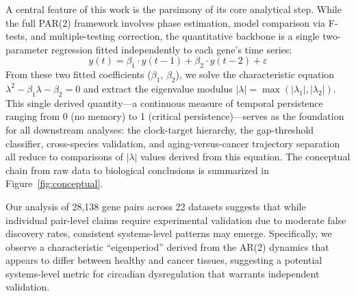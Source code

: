 \documentclass[11pt,a4paper]{article}
\begin{document}
A central feature of this work is the parsimony of its core analytical step. While the full PAR(2) framework involves phase estimation, model comparison via F-tests, and multiple-testing correction, the quantitative backbone is a single two-parameter regression fitted independently to each gene's time series:
\[
y(t) = \beta_1 \cdot y(t{-}1) + \beta_2 \cdot y(t{-}2) + \varepsilon
\]
From these two fitted coefficients ($\beta_1$, $\beta_2$), we solve the characteristic equation $\lambda^2 - \beta_1\lambda - \beta_2 = 0$ and extract the eigenvalue modulus $|\lambda| = \max(|\lambda_1|, |\lambda_2|)$. This single derived quantity---a continuous measure of temporal persistence ranging from 0 (no memory) to 1 (critical persistence)---serves as the foundation for all downstream analyses: the clock-target hierarchy, the gap-threshold classifier, cross-species validation, and aging-versus-cancer trajectory separation all reduce to comparisons of $|\lambda|$ values derived from this equation. The conceptual chain from raw data to biological conclusions is summarized in Figure~\ref{fig:conceptual}.

Our analysis of 28,138 gene pairs across 22 datasets suggests that while individual pair-level claims require experimental validation due to moderate false discovery rates, consistent systems-level patterns may emerge. Specifically, we observe a characteristic ``eigenperiod'' derived from the AR(2) dynamics that appears to differ between healthy and cancer tissues, suggesting a potential systems-level metric for circadian dysregulation that warrants independent validation.
\end{document}
